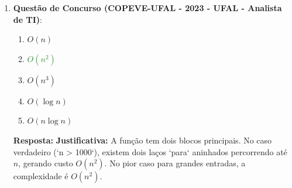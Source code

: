 \documentclass[12pt]{article}
\newcommand{\quadro}[1]{\vspace{0.2cm}\begin{tcolorbox}[colback=green!5, colframe=forestgreen, boxrule=0.5pt, arc=0pt] \textbf{Resposta:} #1 \end{tcolorbox}}
\begin{document}
\begin{enumerate}[label=\arabic*), leftmargin=1.5cm, itemsep=0.8cm]
    \item \textbf{Questão de Concurso (COPEVE-UFAL - 2023 - UFAL - Analista de TI)}: 
    \begin{enumerate}[label=\Alph*)]
        \item $O(n)$
        \item[\textcolor{forestgreen}{\textbf{B)}}] \textcolor{forestgreen}{\textbf{$O(n^2)$}}
        \item $O(n^3)$
        \item $O(\log n)$
        \item $O(n \log n)$
    \end{enumerate}
    \quadro{\textbf{Justificativa:} A função tem dois blocos principais. No caso verdadeiro (`n > 1000`), existem dois laços `para` aninhados percorrendo até $n$, gerando custo $O(n^2)$. No pior caso para grandes entradas, a complexidade é $O(n^2)$.}

\end{enumerate}
\end{document}
